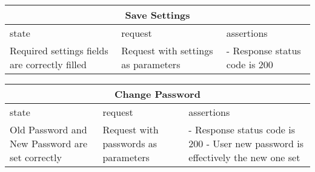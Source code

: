 \begin{center}
	\begin{tabular}{|p{}|p{}|p{}|}
		\hline
		\multicolumn{3}{c}{Save Settings}\\
		
		\hline
		state & request & assertions \\
		
		\hline
		Required settings fields are correctly filled &
		Request with settings as parameters & 
		- Response status code is 200 \newline
		\\
		
		\hline
	\end{tabular}
\end{center}

\begin{center}
	\begin{tabular}{|p{}|p{}|p{}|}
		\hline
		\multicolumn{3}{c}{Change Password}\\
		
		\hline
		state & request & assertions \\
		
		\hline
		Old Password and New Password are set correctly &
		Request with passwords as parameters & 
		- Response status code is 200 \newline
		- User new password is effectively the new one set
		\\
		
		\hline
	\end{tabular}
\end{center}

